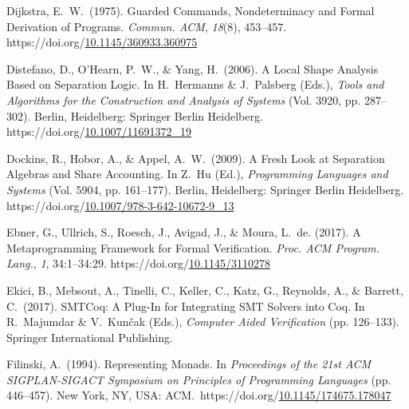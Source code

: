 \documentclass[12pt,twoside]{article}
\begin{document}
{\begin{thebibliography}{222}
\mdbibitemlabel{[Dijkstra, 1975]}Dijkstra, E.~W.~(1975). Guarded Commands, Nondeterminacy and Formal Derivation of Programs. \emph{Commun. ACM}, \emph{18}(8), 453–457. https://doi.org/\href{https://dx.doi.org/10.1145/360933.360975}{10.1145/360933.360975}\label{dijkstra_guarded_1975}%

Distefano, D., O’Hearn, P.~W., \& Yang, H.~(2006). A Local Shape Analysis Based on Separation Logic. In H.~Hermanns \& J.~Palsberg (Eds.), \emph{Tools and Algorithms for the Construction and Analysis of Systems} (Vol. 3920, pp. 287–302). Berlin, Heidelberg: Springer Berlin Heidelberg. https://doi.org/\href{https://dx.doi.org/10.1007/11691372_19}{10.1007/11691372\_19}\label{hermanns_local_2006}%

Dockins, R., Hobor, A., \& Appel, A.~W.~(2009). A Fresh Look at Separation Algebras and Share Accounting. In Z.~Hu (Ed.), \emph{Programming Languages and Systems} (Vol. 5904, pp. 161–177). Berlin, Heidelberg: Springer Berlin Heidelberg. https://doi.org/\href{https://dx.doi.org/10.1007/978-3-642-10672-9_13}{10.1007/978-3-642-10672-9\_13}\label{hutchison_fresh_2009}%

Ebner, G., Ullrich, S., Roesch, J., Avigad, J., \& Moura, L.~de. (2017). A Metaprogramming Framework for Formal Verification. \emph{Proc. ACM Program. Lang.}, \emph{1}, 34:1–34:29. https://doi.org/\href{https://dx.doi.org/10.1145/3110278}{10.1145/3110278}\label{ebner_metaprogramming_2017}%

\mdbibitemlabel{[Ekici et al., 2017]}Ekici, B., Mebsout, A., Tinelli, C., Keller, C., Katz, G., Reynolds, A., \& Barrett, C.~(2017). SMTCoq: A Plug-In for Integrating SMT Solvers into Coq. In R.~Majumdar \& V.~Kunčak (Eds.), \emph{Computer Aided Verification} (pp. 126–133). Springer International Publishing.\label{ekici_smtcoq:_2017}%

\mdbibitemlabel{[Filinski, 1994]}Filinski, A.~(1994). Representing Monads. In \emph{Proceedings of the 21st ACM SIGPLAN-SIGACT Symposium on Principles of Programming Languages} (pp. 446–457). New York, NY, USA: ACM.~https://doi.org/\href{https://dx.doi.org/10.1145/174675.178047}{10.1145/174675.178047}\label{filinski_representing_1994}%


\end{thebibliography}}
\end{document}
